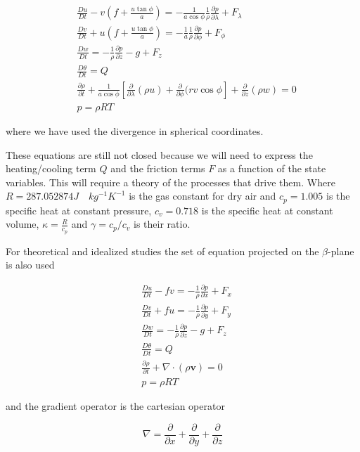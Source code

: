 \[\begin{aligned}
&\frac{D u}{Dt} - v\left(f +  \frac{u \tan{\phi}}{a}\right)  = -\frac{1}{ a \cos{\phi}}\frac{1}{\rho}\frac{\partial p}{\partial \lambda}   + F_\lambda \\
&\frac{D v}{Dt} + u\left( f + \frac{u \tan{\phi}}{a}\right)  = -\frac{1}{a}\frac{1}{\rho}\frac{\partial p}{\partial \phi}  + F_\phi \\
&\frac{D w}{Dt}  = -\frac{1}{\rho }\frac{\partial p}{\partial z} -g  + F_z \label{Eq:PrimEq}\\
&\frac{D \theta}{Dt} = Q \\
&\frac{\partial \rho}{\partial t}+\frac{1}{a\cos{\phi}}\left[ \frac{\partial }{\partial \lambda}(\rho u) + \frac{\partial }{\partial \phi}(rv\cos{\phi} \right] +\frac{\partial }{\partial z}(\rho w) = 0 \\
&p = \rho R T
\end{aligned}\]

where we have used the divergence in spherical coordinates.

These equations are still not closed because we will need to express the
heating/cooling term \(Q\) and the friction terms \(F\) as a function of
the state variables. This will require a theory of the processes that
drive them. Where \(R=287.052874 J \quad kg^{-1} K^{-1}\) is the gas
constant for dry air and \(c_p = 1.005\) is the specific heat at
constant pressure, \(c_v = 0.718\) is the specific heat at constant
volume, \(\kappa = \frac{R}{c_p}\) and \(\gamma=c_p/c_v\) is their
ratio.

For theoretical and idealized studies the set of equation projected on
the \(\beta\)-plane is also used

\[\begin{aligned}
&\frac{D u}{Dt} - fv  = -\frac{1}{\rho}\frac{\partial p}{\partial x}   + F_x \\
&\frac{D v}{Dt} + fu = -\frac{1}{\rho}\frac{\partial p}{\partial y}  + F_y \\
&\frac{D w}{Dt}  = -\frac{1}{\rho }\frac{\partial p}{\partial z} -g  + F_z \\
&\frac{D \theta}{Dt} = Q\\
&\frac{\partial \rho}{\partial t}+\nabla\cdot(\rho\mathbf{v}) = 0\\
&p = \rho R T
\end{aligned}\]

and the gradient operator is the cartesian operator

\[\nabla = \frac{\partial }{\partial x} + \frac{\partial }{\partial y} + \frac{\partial }{\partial z}\]

